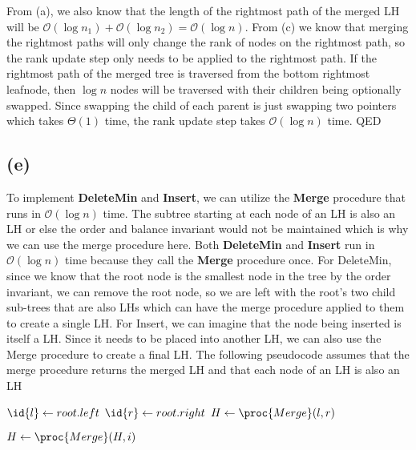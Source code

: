     From (a), we also know that the length of the rightmost path of the merged LH will be $\mathcal{O}(\log{n_1}) + \mathcal{O}(\log{n_2}) = \mathcal{O}(\log{n})$. From (c) we know that merging the rightmost paths will only change the rank of nodes on the rightmost path, so the rank update step only needs to be applied to the rightmost path. If the rightmost path of the merged tree is traversed from the bottom rightmost leafnode, then $\log{n}$ nodes will be traversed with their children being optionally swapped. Since swapping the child of each parent is just swapping two pointers which takes $\Theta(1)$ time, the rank update step takes $\mathcal{O}(\log{n})$ time.
    QED

    \subsection{(e)}
    To implement \textbf{DeleteMin} and \textbf{Insert}, we can utilize the \textbf{Merge} procedure that runs in $\mathcal{O}(\log{n})$ time. The subtree starting at each node of an LH is also an LH or else the order and balance invariant would not be maintained which is why we can use the merge procedure here. Both \textbf{DeleteMin} and \textbf{Insert} run in $\mathcal{O}(\log{n})$ time because they call the \textbf{Merge} procedure once. For DeleteMin, since we know that the root node is the smallest node in the tree by the order invariant, we can remove the root node, so we are left with the root's two child sub-trees that are also LHs which can have the merge procedure applied to them to create a single LH. For Insert, we can imagine that the node being inserted is itself a LH. Since it needs to be placed into another LH, we can also use the Merge procedure to create a final LH.
    The following pseudocode assumes that the merge procedure returns the merged LH and that each node of an LH is also an LH
        \begin{codebox}
        \li $\id{l} \gets root.left$
        \li $\id{r} \gets root.right$
        \li $H \gets \proc{Merge}(l, r)$
        \end{codebox}
        \begin{codebox}
        \li $H \gets \proc{Merge}(H, i)$
        \end{codebox}
        